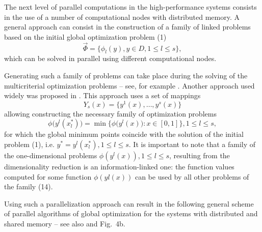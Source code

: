 \documentclass[
11pt,%
tightenlines,%
twoside,%
onecolumn,%
nofloats,%
nobibnotes,%
nofootinbib,%
superscriptaddress,%
noshowpacs,%
centertags]%
{revtex4}
\begin{document}
The next level of parallel computations in the high-performance systems consists in the use of a number of computational nodes with distributed memory. A general approach can consist in the construction of a family of linked problems based on the initial global optimization problem (1)
\begin{equation}
\overrightarrow{\Phi} = \{ \phi_l(y), y \in D, 1 \leq l \leq s \},
\end{equation}
which can be solved in parallel using different computational nodes.

Generating such a family of problems can take place during the solving of the multicriterial optimization problems -- see, for example \cite{Gergel3, Gergel4}. Another approach used widely was proposed in \cite{Strongin1, Strongin2, Strongin5, Gergel1}. This approach uses a set of mappings
\begin{equation}
Y_s(x) = \{ y^1(x), \dots , y^s(x) \}
\end{equation}
allowing constructing the necessary family of optimization problems 
\begin{equation}
\phi\bigl(y^l(x^\ast_l)\bigr) = \min \bigl\{\phi\bigl(y^l(x)\bigl): x \in [0, 1] \bigl\}, 1 \leq l \leq s,
\end{equation}
for which the global minimum points coincide with the solution of the initial problem (1), i.e. $ y^\ast = y^l(x_l^\ast), 1 \leq l \leq s$. It is important to note that a family of the one-dimensional problems $\phi(y^l(x)), 1 \leq l \leq s$, resulting from the dimensionality reduction is an information-linked one: the function values computed for some function $\phi(yl(x))$ can be used by all other problems of the family (14).

Using such a parallelization approach can result in the following general scheme of parallel algorithms of global optimization for the systems with distributed and shared memory -- see also \cite{Gergel1} and Fig.~4b.
\end{document}
